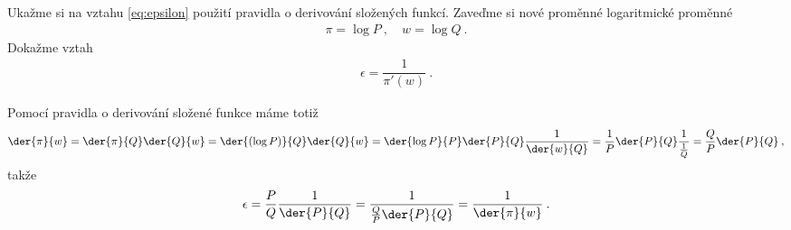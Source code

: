 \begin{example}
    Ukažme si na vztahu \eqref{eq:epsilon} použití pravidla o derivování složených funkcí. Zaveďme si nové proměnné logaritmické proměnné
    \begin{align}
        \pi = \log P \:, \quad w = \log Q \:.
    \end{align}
    Dokažme vztah \begin{align}
        \epsilon = \dfrac{1}{\pi'(w)} \:.
    \end{align}
    
    
    Pomocí pravidla o derivování složené funkce máme totiž \begin{align}
        \der{\pi}{w} = \der{\pi}{Q} \der{Q}{w} 
        = \der{(\log P)}{Q} \der{Q}{w} 
        = \der{\log P}{P} \der{P}{Q} \dfrac{1}{\der{w}{Q}}
        = \frac{1}{P} \der{P}{Q} \dfrac{1}{\frac{1}{Q}}
        = \frac{Q}{P} \der{P}{Q} \:,
    \end{align}
    takže \begin{align}
        \epsilon = \frac{P}{Q} \dfrac{1}{\der{P}{Q}} = \dfrac{1}{\frac{Q}{P} \der{P}{Q}} = \dfrac{1}{\der{\pi}{w}} \:.
    \end{align}
\end{example}
